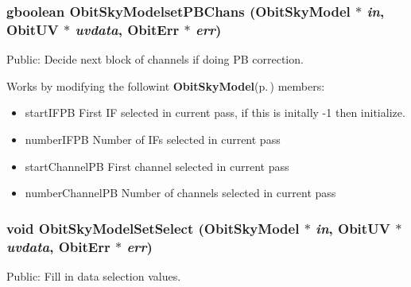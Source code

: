 \subsubsection{\setlength{\rightskip}{0pt plus 5cm}gboolean Obit\-Sky\-Modelset\-PBChans ({\bf Obit\-Sky\-Model} $\ast$ {\em in}, {\bf Obit\-UV} $\ast$ {\em uvdata}, {\bf Obit\-Err} $\ast$ {\em err})}\label{ObitSkyModel_8c_a35}


Public: Decide next block of channels if doing PB correction. 

Works by modifying the followint {\bf Obit\-Sky\-Model}{\rm (p.\,\pageref{structObitSkyModel})} members: \begin{itemize}
\item start\-IFPB First IF selected in current pass, if this is initally -1 then initialize. \item number\-IFPB Number of IFs selected in current pass \item start\-Channel\-PB First channel selected in current pass \item number\-Channel\-PB Number of channels selected in current pass 
\end{itemize}
\subsubsection{\setlength{\rightskip}{0pt plus 5cm}void Obit\-Sky\-Model\-Set\-Select ({\bf Obit\-Sky\-Model} $\ast$ {\em in}, {\bf Obit\-UV} $\ast$ {\em uvdata}, {\bf Obit\-Err} $\ast$ {\em err})}\label{ObitSkyModel_8c_a34}


Public: Fill in data selection values. 

